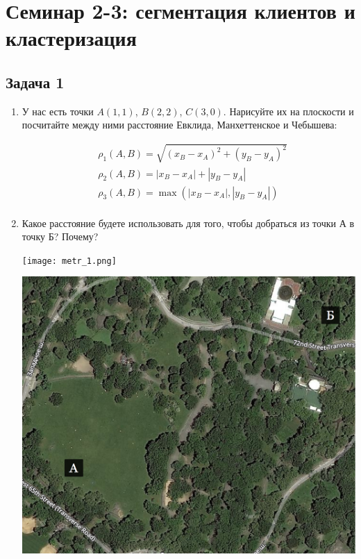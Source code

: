 \documentclass[12pt, a4paper, oneside]{article}
\begin{document}
\section*{Семинар 2-3:  сегментация клиентов и кластеризация}

\subsection*{Задача 1 }

\begin{enumerate}

\item У нас есть точки $A(1,1)$, $B(2,2)$, $C(3,0)$. Нарисуйте их на плоскости и посчитайте между ними расстояние Евклида, Манхеттенское и Чебышева: 

\begin{equation}
\begin{aligned}
& \rho_1(A,B) = \sqrt{(x_B - x_A)^2 + (y_B - y_A)^2} \\ 
& \rho_2(A,B) = |x_B - x_A| + |y_B - y_A|  \\
& \rho_3(A,B) = \max(|x_B - x_A|, |y_B - y_A|) \\
\end{aligned}
\end{equation}


\item Какое расстояние будете использовать для того, чтобы добраться из точки А в точку Б? Почему? 

\begin{minipage}[t]{0.45\textwidth}
	\texttt{[image: metr\_1.png]}
\end{minipage}
\hfill
\begin{minipage}[t]{0.45\textwidth}
	\includegraphics[scale=0.12]{metr_2.png}
\end{minipage}


\end{enumerate}
\end{document}
